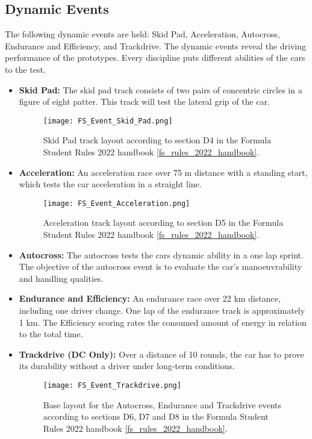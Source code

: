 \subsection{Dynamic Events}
The following dynamic events are held: Skid Pad, Acceleration, Autocross, Endurance and Efficiency, and Trackdrive.
The dynamic events reveal the driving performance of the prototypes. Every discipline puts different abilities of the cars to the test.
\begin{itemize}
    \item \textbf{Skid Pad:} The skid pad track consists of two pairs of concentric circles in a figure of eight patter. This track will test the lateral grip of the car.
    \begin{figure}[H]
        \centering
        \texttt{[image: FS\_Event\_Skid\_Pad.png]}
        \caption{Skid Pad track layout according to section D4 in the Formula Student Rules 2022 handbook \ref{fs_rules_2022_handbook}.}
        \label{fig:FS Skid Pad layout}
    \end{figure}
    \item \textbf{Acceleration:} An acceleration race over 75 m distance with a standing start, which tests the car acceleration in a straight line.
    \begin{figure}[H]
        \centering
        \texttt{[image: FS\_Event\_Acceleration.png]}
        \caption{Acceleration track layout according to section D5 in the Formula Student Rules 2022 handbook \ref{fs_rules_2022_handbook}.}
        \label{fig:FS Acceleration layout}
    \end{figure}
    \item \textbf{Autocross:} The autocross tests the cars dynamic ability in a one lap sprint. The objective of the autocross event is to evaluate the car's manoeuvrability and handling qualities.
    \item \textbf{Endurance and Efficiency:} An endurance race over 22 km distance, including one driver change. One lap of the endurance track is approximately 1 km. The Efficiency scoring rates the consumed amount of energy in relation to the total time.
    \item \textbf{Trackdrive (DC Only):}  Over a distance of 10 rounds, the car has to prove its durability without a driver under long-term conditions.
    \begin{figure}[H]
        \centering
        \texttt{[image: FS\_Event\_Trackdrive.png]}
        \caption{Base layout for the Autocross, Endurance and Trackdrive events according to sections D6, D7 and D8 in the Formula Student Rules 2022 handbook \ref{fs_rules_2022_handbook}.}
        \label{fig:FS Autocross, Endurance and Trackdrive layout}
    \end{figure}
\end{itemize}

